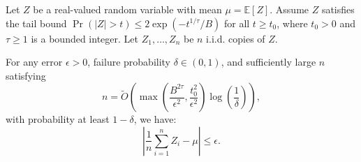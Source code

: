 \documentclass[10pt,a4paper]{amsart}
\newcommand{\E}{\mathbb{E}}
\begin{document}
\begin{lemma}\label{lemma:concentration-via-clipping}
Let $Z$ be a real-valued random variable with mean $\mu = \E[Z]$. 
Assume $Z$ satisfies the tail bound $\Pr(|Z| > t) \le 2\exp(-t^{1/\tau}/B)$ for all $t \ge t_0$, where $t_0 > 0$ and $\tau \ge 1$ is a bounded integer. 
Let $Z_1, \dots, Z_n$ be $n$ i.i.d. copies of $Z$.

For any error $\epsilon > 0$, failure probability $\delta \in (0, 1)$, and sufficiently large $n$ satisfying  
\[
n = \tilde{O}\left( \max\left( \frac{B^{2\tau}}{\epsilon^2}, \frac{t_0^2}{\epsilon^2} \right) \log \left( \frac 1 \delta \right) \right),
\]
with probability at least $1-\delta$, we have:
\[
\left| \frac{1}{n}\sum_{i=1}^n Z_i - \mu \right| \le \epsilon.
\]
\end{lemma}
\end{document}
